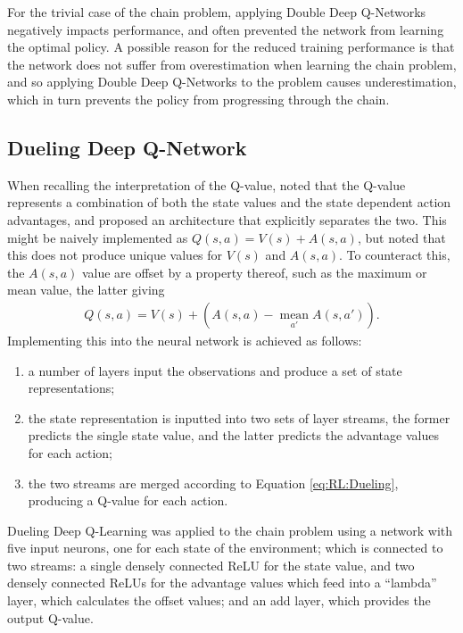 For the trivial case of the chain problem, applying Double Deep Q-Networks
negatively impacts performance, and often prevented the network from learning
the optimal policy.
A possible reason for the reduced training performance is that the network does
not suffer from overestimation when learning the chain problem, and so applying
Double Deep Q-Networks to the problem causes underestimation, which in turn
prevents the policy from progressing through the chain.



\subsection{Dueling Deep Q-Network}

When recalling the interpretation of the Q-value, \cite{Wang:2015:Dueling} noted
that the Q-value represents a combination of both the state values and the state
dependent action advantages, and proposed an architecture that explicitly
separates the two.
This might be naively implemented as $Q(s,a) = V(s) + A(s,a)$, but
\citeauthor{Wang:2015:Dueling} noted that this does not produce unique values
for $V(s)$ and $A(s,a)$.
To counteract this, the $A(s,a)$ value are offset by a property thereof, such as
the maximum or mean value, the latter giving
\begin{align}
    Q(s,a) = V(s) + \left(A(s,a) - \underset{a'}{\operatorname{mean}}A(s,a')\right).
    \label{eq:RL:Dueling}
\end{align}
Implementing this into the neural network is achieved as follows:
\begin{enumerate}
    \item a number of layers input the observations and produce a set of state
        representations;
    \item the state representation is inputted into two sets of layer streams,
        the former predicts the single state value, and the latter predicts the
        advantage values for each action;
    \item the two streams are merged according to Equation \ref{eq:RL:Dueling},
        producing a Q-value for each action.
\end{enumerate}


Dueling Deep Q-Learning was applied to the chain problem using a network with
five input neurons, one for each state of the environment; which is connected
to two streams: a single densely connected ReLU for the state value, and two
densely connected ReLUs for the advantage values which feed into a ``lambda''
layer, which calculates the offset values; and an add layer, which provides the
output Q-value.


